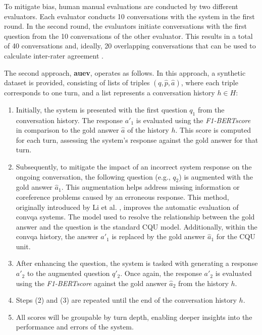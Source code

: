 To mitigate bias, human manual evaluations are conducted by two different evaluators. Each evaluator conducts 10 conversations with the system in the first round. In the second round, the evaluators initiate conversations with the first question from the 10 conversations of the other evaluator. This results in a total of 40 conversations and, ideally, 20 overlapping conversations that can be used to calculate inter-rater agreement \cite{cohen_coefficient_1960}.

The second approach, \textbf{\gls{auev}}, operates as follows. In this approach, a synthetic dataset is provided, consisting of lists of triples $(q, \hat{p}, \hat{a})$, where each triple corresponds to one turn, and a list represents a conversation history $h \in H$:

\begin{enumerate}
    \item Initially, the system is presented with the first question $q_1$ from the conversation history. The response $a'_1$ is evaluated using the \textit{F1-BERTscore} in comparison to the gold answer $\hat{a}$ of the history $h$. This score is computed for each turn, assessing the system's response against the gold answer for that turn.
    \item Subsequently, to mitigate the impact of an incorrect system response on the ongoing conversation, the following question (e.g., $q_2$) is augmented with the gold answer $\hat{a}_1$. This augmentation helps address missing information or coreference problems caused by an erroneous response. This method, originally introduced by Li et al. \cite{li_ditch_2022}, improves the automatic evaluation of \gls{convqa} systems. The model used to resolve the relationship between the gold answer and the question is the standard CQU model. Additionally, within the \gls{convqa} history, the answer $a'_1$ is replaced by the gold answer $\hat{a}_1$ for the CQU unit.
    \item After enhancing the question, the system is tasked with generating a response $a'_2$ to the augmented question $q'_2$. Once again, the response $a'_2$ is evaluated using the \textit{F1-BERTscore} against the gold answer $\hat{a}_2$ from the history $h$.
    \item Steps (2) and (3) are repeated until the end of the conversation history $h$.
    \item All scores will be groupable by turn depth, enabling deeper insights into the performance and errors of the system.
\end{enumerate}

